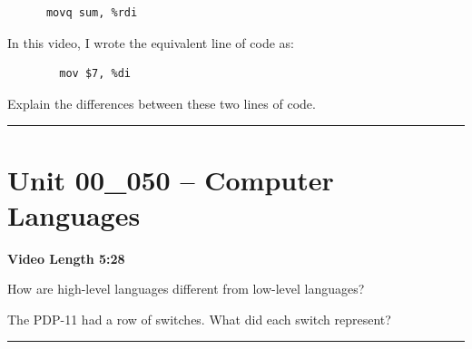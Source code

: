 \documentclass[letterpaper,12pt]{exam}
\newcommand{\unit}{Unit 00}
\begin{document}
\begin{questions}
\begin{samepage}
     \begin{verbatim}
      movq sum, %rdi       
     \end{verbatim}
     In this video, I wrote the equivalent line of code as:
     \begin{verbatim}
        mov $7, %di
        \end{verbatim}
        Explain the differences between these two lines of code.
     \vspace{5mm}
 \end{samepage}
 \par
  

\rule{0.5\textwidth}{.4pt} %
\section*{\unit\_050 -- Computer Languages}
\par{\selectfont\textbf{Video Length 5:28}}
\begin{samepage}
    \question How are high-level languages different from low-level languages?
    \vspace{5mm}
\end{samepage}
\par
\begin{samepage}
    \question The PDP-11 had a row of switches.  What did each switch represent?
    \vspace{5mm}
\end{samepage}
\rule{0.5\textwidth}{.4pt} %



\end{questions}
\end{document}
